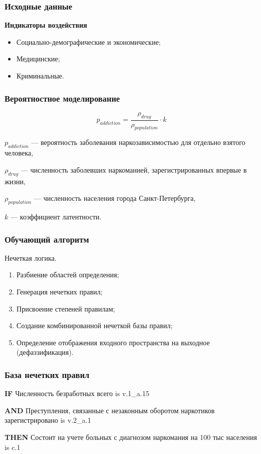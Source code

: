 \documentclass[t]{beamer}  %
\begin{document}
\begin{frame}
    \frametitle{Исходные данные}
    \textbf{Индикаторы воздействия}
    \begin{itemize}
    \item Социально-демографические и экономические;
    \item Медицинские;
    \item Криминальные.
    \end{itemize}
\end{frame}
\begin{frame}
    \frametitle{Вероятностное моделирование} 
    \begin{equation}
        p_{addiction} = \frac{\rho_{drug}}{\rho_{population}}\cdot k
    \end{equation}

    \(p_{addiction}\) --- вероятность заболевания наркозависимостью для
    отдельно взятого человека, 
    
    \(\rho_{drug}\) --- численность заболевших
    наркоманией, зарегистрированных впервые в жизни, 
    
    \(\rho_{population}\) ---
    численность населения города Санкт-Петербурга, 
    
    \(k\) --- коэффициент
    латентности.
\end{frame}

\begin{frame}
    \frametitle{Обучающий алгоритм} 
	\begin{block}{Нечеткая логика. }
        \begin{enumerate}
            \item Разбиение областей определения;
            \item Генерация нечетких правил;
            \item Присвоение степеней правилам;
            \item Создание комбинированной нечеткой базы правил;
            \item Определение отображения входного пространства на выходное
                (дефаззификация).
        \end{enumerate}
	\end{block}

\end{frame}
\begin{frame}
    \frametitle{База нечетких правил}
    \textbf{IF} Численность безработных всего is \alert{v.1\_a.15} 
    
    \textbf{AND} Преступления, связанные с незаконным оборотом наркотиков зарегистрировано is
    \alert{v.2\_a.1} 

    \textbf{THEN} Состоит на учете больных с диагнозом наркомания на 100 тыс населения is
    \alert{c.1}
\end{frame}
\end{document}
